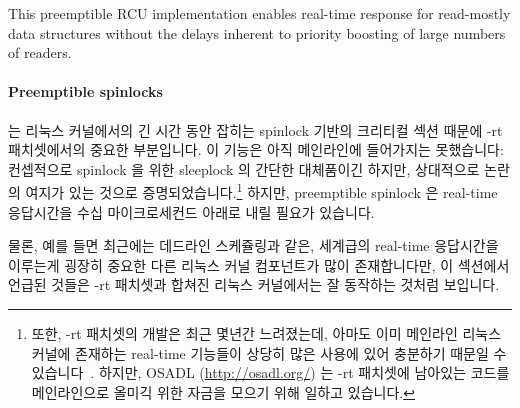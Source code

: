 This preemptible RCU implementation enables real-time response for
read-mostly data structures without the delays inherent to priority
boosting of large numbers of readers.
\fi

\paragraph{Preemptible spinlocks}
는 리눅스 커널에서의 긴 시간 동안 잡히는 spinlock 기반의 크리티컬 섹션 때문에
-rt 패치셋에서의 중요한 부분입니다.
이 기능은 아직 메인라인에 들어가지는 못했습니다: 컨셉적으로 spinlock 을 위한
sleeplock 의 간단한 대체품이긴 하지만, 상대적으로 논란의 여지가 있는 것으로
증명되었습니다.\footnote{
	또한, -rt 패치셋의 개발은 최근 몇년간 느려졌는데, 아마도 이미 메인라인
	리눅스 커널에 존재하는 real-time 기능들이 상당히 많은 사용에 있어
	충분하기 때문일 수
	있습니다~\cite{JakeEdge2013Future-rtLinux,JakeEdge2014Future-rtLinux}.
	하지만, OSADL (\url{http://osadl.org/}) 는 -rt 패치셋에 남아있는 코드를
	메인라인으로 올미긱 위한 자금을 모으기 위해 일하고 있습니다.}
하지만, preemptible spinlock 은 real-time 응답시간을 수십 마이크로세컨드 아래로
내릴 필요가 있습니다.

물론, 예를 들면 최근에는 데드라인 스케쥴링과 같은, 세계급의 real-time
응답시간을 이루는게 굉장히 중요한 다른 리눅스 커널 컴포넌트가 많이
존재합니다만, 이 섹션에서 언급된 것들은 -rt 패치셋과 합쳐진 리눅스 커널에서는
잘 동작하는 것처럼 보입니다.

